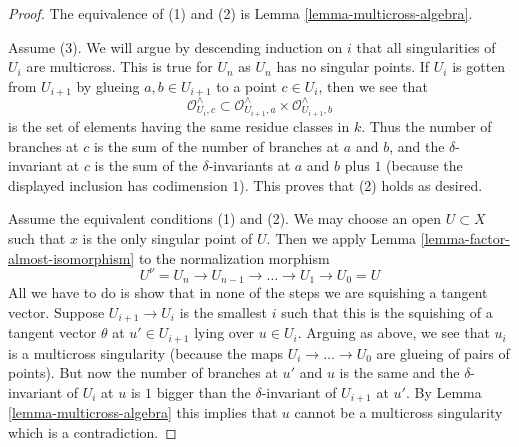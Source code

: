 \documentclass[10pt,a4paper]{amsart}
\theoremstyle{plain}
\theoremstyle{definition}
\theoremstyle{remark}
\numberwithin{equation}{subsection}
\begin{document}
\begin{proof}
The equivalence of (1) and (2) is Lemma \ref{lemma-multicross-algebra}.

\medskip\noindent
Assume (3). We will argue by descending induction on $i$ that all singularities
of $U_i$ are multicross. This is true for $U_n$ as $U_n$ has no singular points.
If $U_i$ is gotten from $U_{i + 1}$ by glueing $a, b \in U_{i + 1}$
to a point $c \in U_i$, then we see that
$$
\mathcal{O}_{U_i, c}^\wedge \subset
\mathcal{O}_{U_{i + 1}, a}^\wedge \times \mathcal{O}_{U_{i + 1}, b}^\wedge
$$
is the set of elements having the same residue classes in $k$.
Thus the number of branches at $c$ is the sum of the number of
branches at $a$ and $b$, and the $\delta$-invariant at $c$
is the sum of the $\delta$-invariants at $a$ and $b$ plus $1$
(because the displayed inclusion has codimension $1$).
This proves that (2) holds as desired.

\medskip\noindent
Assume the equivalent conditions (1) and (2). We may choose an open
$U \subset X$ such that $x$ is the only singular point of $U$.
Then we apply Lemma \ref{lemma-factor-almost-isomorphism} to
the normalization morphism
$$
U^\nu = U_n \to U_{n - 1} \to \ldots \to U_1 \to U_0 = U
$$
All we have to do is show that in none of the steps we are
squishing a tangent vector. Suppose $U_{i + 1} \to U_i$ is the
smallest $i$ such that this is the squishing of a tangent
vector $\theta$ at $u' \in U_{i + 1}$ lying over $u \in U_i$.
Arguing as above, we see that $u_i$ is a multicross singularity
(because the maps $U_i \to \ldots \to U_0$ are glueing of
pairs of points). But now the number of branches at $u'$ and $u$
is the same and the $\delta$-invariant of $U_i$ at $u$
is $1$ bigger than the $\delta$-invariant of $U_{i + 1}$ at $u'$.
By Lemma \ref{lemma-multicross-algebra}
this implies that $u$ cannot be a multicross singularity which
is a contradiction.
\end{proof}
\end{document}
